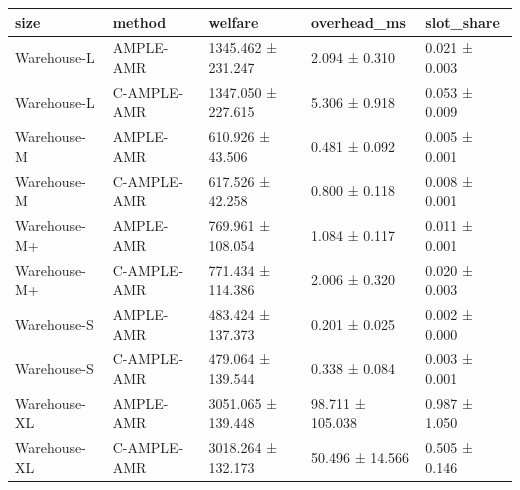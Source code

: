 \begin{tabular}{lllll}
\toprule
size & method & welfare & overhead\_ms & slot\_share \\
\midrule
Warehouse-L & AMPLE-AMR & 1345.462 ± 231.247 & 2.094 ± 0.310 & 0.021 ± 0.003 \\
Warehouse-L & C-AMPLE-AMR & 1347.050 ± 227.615 & 5.306 ± 0.918 & 0.053 ± 0.009 \\
Warehouse-M & AMPLE-AMR & 610.926 ± 43.506 & 0.481 ± 0.092 & 0.005 ± 0.001 \\
Warehouse-M & C-AMPLE-AMR & 617.526 ± 42.258 & 0.800 ± 0.118 & 0.008 ± 0.001 \\
Warehouse-M+ & AMPLE-AMR & 769.961 ± 108.054 & 1.084 ± 0.117 & 0.011 ± 0.001 \\
Warehouse-M+ & C-AMPLE-AMR & 771.434 ± 114.386 & 2.006 ± 0.320 & 0.020 ± 0.003 \\
Warehouse-S & AMPLE-AMR & 483.424 ± 137.373 & 0.201 ± 0.025 & 0.002 ± 0.000 \\
Warehouse-S & C-AMPLE-AMR & 479.064 ± 139.544 & 0.338 ± 0.084 & 0.003 ± 0.001 \\
Warehouse-XL & AMPLE-AMR & 3051.065 ± 139.448 & 98.711 ± 105.038 & 0.987 ± 1.050 \\
Warehouse-XL & C-AMPLE-AMR & 3018.264 ± 132.173 & 50.496 ± 14.566 & 0.505 ± 0.146 \\
\bottomrule
\end{tabular}
